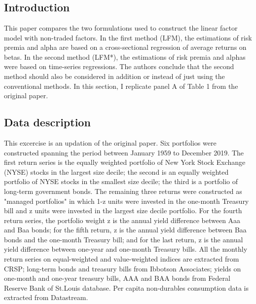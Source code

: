 \documentclass[11pt]{article}
\begin{document}
\clearpage
 
 

\section{\cite{hansen1997assessing}} \label{sec:HJ}

\subsection{Introduction}
 This paper compares the two formulations used to construct the linear factor model with non-traded factors. In the first method (LFM), the estimations of risk premia and alpha are based on a cross-sectional regression of average returns on betas. In the second method (LFM*), the estimations of risk premia and alphas were based on time-series regressions. The authors conclude that the second method should also be considered in addition or instead of just using the conventional methods. In this section, I replicate panel A of Table 1 from the original paper.  
 
 
 \subsection{Data description}
 This excercise is an updation of the original paper. Six portfolios were constructed spanning the period between January 1959 to December 2019. The first return series is the
equally weighted portfolio of New York Stock Exchange (NYSE) stocks in the largest size decile; the second is an equally weighted portfolio of NYSE stocks in the smallest size decile; the third is a portfolio of long-term government bonds. The remaining three
returns were constructed as "managed portfolios" in which 1-z units were
invested in the one-month Treasury bill and z units were invested in the
largest size decile portfolio. For the fourth return series, the portfolio weight z is the
annual yield difference between Aaa and Baa bonds; for the fifth return, z is the annual yield difference between Baa bonds and the one-month Treasury
bill; and for the last return, z is the annual yield difference between one-year
and one-month Treasury bills. All the monthly return series on equal-weighted and value-weighted indices are extracted from CRSP; long-term bonds and treasury bills from Ibbotson Associates; yields on one-month and one-year treasury bills, AAA and BAA bonds from Federal Reserve Bank of St.Louis database. Per capita non-durables consumption data is extracted from Datastream.
 
\end{document}
